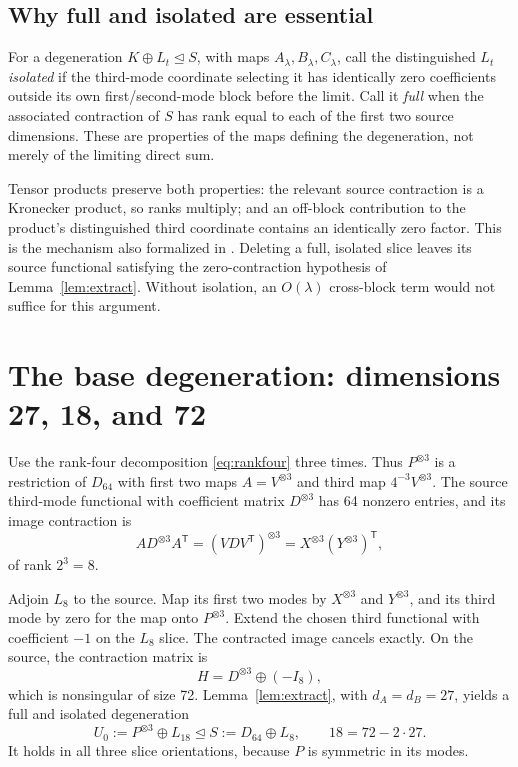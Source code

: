 \documentclass[11pt]{article}
\newcommand{\degto}{\trianglelefteq}
\theoremstyle{definition}\newtheorem{definition}[theorem]{Definition}
\theoremstyle{remark}\newtheorem{remark}[theorem]{Remark}
\begin{document}
\subsection{Why full and isolated are essential}
For a degeneration $K\oplus L_t\degto S$, with maps $A_\lambda,B_\lambda,C_\lambda$,
call the distinguished $L_t$ \emph{isolated} if the third-mode coordinate
selecting it has identically zero coefficients outside its own first/second-mode
block before the limit. Call it \emph{full} when the associated contraction of
$S$ has rank equal to each of the first two source dimensions.
These are properties of the maps defining the degeneration, not merely of the
limiting direct sum.

Tensor products preserve both properties: the relevant source contraction is a
Kronecker product, so ranks multiply; and an off-block contribution to the
product's distinguished third coordinate contains an identically zero factor.
This is the mechanism also formalized in \cite[Propositions 5.1--5.6]{alman}.
Deleting a full, isolated slice leaves its source functional satisfying the
zero-contraction hypothesis of Lemma~\ref{lem:extract}. Without isolation, an
$O(\lambda)$ cross-block term would not suffice for this argument.

\section{The base degeneration: dimensions 27, 18, and 72}\label{sec:base}
Use the rank-four decomposition \eqref{eq:rankfour} three times. Thus
$P^{\otimes3}$ is a restriction of $D_{64}$ with first two maps
$A=V^{\otimes3}$ and third map $4^{-3}V^{\otimes3}$.
The source third-mode functional with coefficient matrix $D^{\otimes3}$ has
64 nonzero entries, and its image contraction is
\[
A D^{\otimes3}A^\mathsf T
=(VDV^\mathsf T)^{\otimes3}
=X^{\otimes3}(Y^{\otimes3})^\mathsf T,
\]
of rank $2^3=8$.

Adjoin $L_8$ to the source. Map its first two modes by $X^{\otimes3}$ and
$Y^{\otimes3}$, and its third mode by zero for the map onto $P^{\otimes3}$.
Extend the chosen third functional with coefficient $-1$ on the $L_8$ slice.
The contracted image cancels exactly. On the source, the contraction matrix is
\[
H=D^{\otimes3}\oplus(-I_8),
\]
which is nonsingular of size 72. Lemma~\ref{lem:extract}, with $d_A=d_B=27$,
yields a full and isolated degeneration
\begin{equation}\label{eq:base}
U_0:=P^{\otimes3}\oplus L_{18}\degto S:=D_{64}\oplus L_8,
\qquad 18=72-2\cdot27.
\end{equation}
It holds in all three slice orientations, because $P$ is symmetric in its modes.
\end{document}
